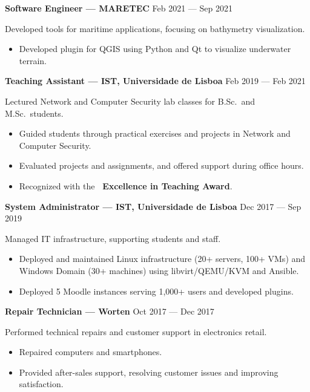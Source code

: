 \documentclass[11pt,a4paper]{article}
\begin{document}
\textbf{Software Engineer --- MARETEC}
\hfill
Feb 2021 --- Sep 2021

Developed tools for maritime applications, focusing on bathymetry visualization.

\begin{itemize}[noitemsep]
  \item Developed plugin for QGIS using Python and Qt to visualize underwater
  terrain.
\end{itemize}

\textbf{Teaching Assistant --- IST, Universidade de Lisboa}
\hfill
Feb 2019 --- Feb 2021

Lectured Network and Computer Security lab classes for B.Sc.\ and M.Sc.\
students.

\begin{itemize}[noitemsep]
  \item Guided students through practical exercises and projects in Network and
  Computer Security.
  \item Evaluated projects and assignments, and offered support during
  office hours.
  \item Recognized with the \textbf{\faAward\ Excellence in Teaching Award}.
\end{itemize}

\textbf{System Administrator --- IST, Universidade de Lisboa}
\hfill
Dec 2017 --- Sep 2019

Managed IT infrastructure, supporting students and staff.

\begin{itemize}[noitemsep]
  \item Deployed and maintained Linux infrastructure (20+ servers, 100+ VMs) and
  Windows Domain (30+ machines) using libvirt/QEMU/KVM and Ansible.
  \item Deployed 5 Moodle instances serving 1,000+ users and developed
  plugins.
\end{itemize}

\textbf{Repair Technician --- Worten}
\hfill
Oct 2017 --- Dec 2017

Performed technical repairs and customer support in electronics retail.

\begin{itemize}[noitemsep]
  \item Repaired computers and smartphones.
  \item Provided after-sales support, resolving customer issues and improving
  satisfaction.
\end{itemize}
\end{document}
